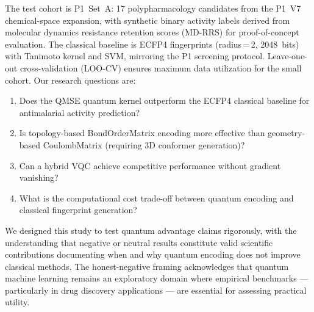 The test cohort is P1~Set~A: 17 polypharmacology candidates from the P1~V7 chemical-space expansion,\cite{Sao2026P1ChemSpace} with synthetic binary activity labels derived from molecular dynamics resistance retention scores (MD-RRS) for proof-of-concept evaluation. The classical baseline is ECFP4 fingerprints (radius\,=\,2, 2048~bits) with Tanimoto kernel and SVM, mirroring the P1 screening protocol.\cite{Sao2026P1ChemSpace} Leave-one-out cross-validation (LOO-CV) ensures maximum data utilization for the small cohort. Our research questions are:

\begin{enumerate}
    \item Does the QMSE quantum kernel outperform the ECFP4 classical baseline for antimalarial activity prediction?
    \item Is topology-based BondOrderMatrix encoding more effective than geometry-based CoulombMatrix (requiring 3D conformer generation)?
    \item Can a hybrid VQC achieve competitive performance without gradient vanishing?
    \item What is the computational cost trade-off between quantum encoding and classical fingerprint generation?
\end{enumerate}

We designed this study to test quantum advantage claims rigorously, with the understanding that negative or neutral results constitute valid scientific contributions documenting when and why quantum encoding does not improve classical methods.\cite{Cerezo2023QMLChallenges,Huang2021PowerQuantum} The honest-negative framing acknowledges that quantum machine learning remains an exploratory domain where empirical benchmarks — particularly in drug discovery applications — are essential for assessing practical utility.\cite{Liu2021RigorousFramework}

